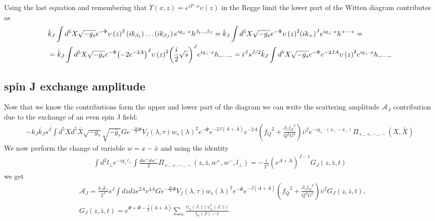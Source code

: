 \documentclass[a4paper,12pt]{article}
\begin{document}
Using the last equation and remembering that $\Upsilon\left(x, z\right) = e^{i P \cdot x} \upsilon\left(z\right)$ in the Regge limit the lower part of the Witten diagram contributes as
\begin{align}
&\bar{k}_J \int d^5 X \sqrt{-g_s} e^{-\Phi}  {\upsilon\left(z\right)}^2 \left( i k_{\beta_1}\right) \dots \left( i k_{\beta_J}\right) e^{i q_\perp \cdot x}  h^{\beta_1 \dots \beta_J} = \bar{k}_J \int d^5 X \sqrt{-g_s} e^{-\Phi}  {\upsilon\left(z\right)}^2 {\left( i k_+\right)}^J e^{i q_\perp \cdot x}  h^{+ \dots +} = \notag \\
& = \bar{k}_J \int d^5 X \sqrt{-g_s} e^{-\Phi} {\left( - 2 e^{-2 A}\right)}^J {\upsilon\left(z\right)}^2 {\left( \frac{i}{2} \sqrt{s}\right)}^J e^{i q_\perp \cdot x}  h_{- \dots -}  = i^J s^{J/2}  \bar{k}_J \int d^5 X \sqrt{-g_s} e^{-\Phi} e^{-2 J A} {\upsilon\left(z\right)}^2 e^{i q_\perp \cdot x}  h_{- \dots -}
\end{align}

\subsection{spin J exchange amplitude}
Now that we know the contributions form the upper and lower part of the diagram we can write the scattering amplitude $\mathcal{A}_J$ contribution due to the exchange of an even spin J field:
\begin{align}
 - k_J \bar{k}_J s^J \int d^5X d^5 \bar{X} \sqrt{-g_s} \sqrt{-\bar{g}_s} G e^{-\frac{10}{3}\Phi} V_f \left( \lambda, \tau \right) {w_s\left(\lambda \right)}^2 e^{-\bar{\Phi}} e^{-2 J \left(A+\bar{A}\right)}  e^{-2A} \left(  {f_Q}^2 + \frac{{\partial_z f_Q}^2}{Q^2 G^2}  \right)  {\bar{\upsilon}}^2 e^{-i q_\perp \cdot \left( x_\perp - \bar{x}_\perp \right)} \Pi _{+\dots+,-\dots-}\left(X, \bar{X} \right)
\end{align}
We now perform the change of variable $w = x - \bar{x}$ and using the identity
\begin{align}
 \int d^2 l_\perp e^{- i q_\perp l_\perp} \int \frac{dw^+ dw^-}{2} \Pi_{+ \dots +, - \dots -} \left(z, \bar{z}, w^+, w^-, l_\perp \right) = - \frac{i}{2^J} {\left( e^{A + \bar{A}} \right)}^{J-1}G_J \left(z, \bar{z}, t\right)
\end{align}
we get
\begin{align}
 & \mathcal{A}_J = \frac{k_J \bar{k}_J}{2^J} s^J \int dz d\bar{z} e^{2 A}e^{4 \bar{A}} G e^{-\frac{10}{3}\Phi} V_f \left( \lambda, \tau \right) {w_s\left(\lambda \right)}^2 e^{-\bar{\Phi}} e^{-J \left(A+\bar{A}\right)}  \left(  {f_Q}^2 + \frac{{\partial_z f_Q}^2}{Q^2 G^2}  \right)  {\bar{\upsilon}}^2 G_J \left(z, \bar{z}, t\right), \\ 
 & G_J \left(z , \bar{z}, t \right) = e^{\Phi + \bar{\Phi} - \frac{1}{2} \left(A + \bar{A}\right)} \sum_n \frac{\psi_n \left(J, z\right) \psi_n^* \left(J, \bar{z}\right)}{t_n\left(J\right) - t}
\end{align}
\end{document}
